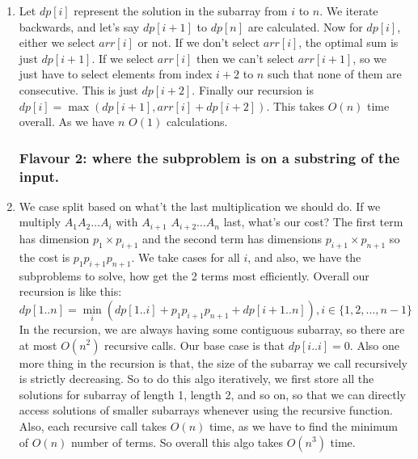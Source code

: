 \documentclass[12pt]{report}
\begin{document}
\begin{enumerate}[label=\textbf{\arabic*.}]
  \item Let $dp[i]$ represent the solution in the subarray from $i$ to $n$. We iterate backwards, and let's say $dp[i+1]$ to $dp[n]$ are calculated. Now for $dp[i]$, either we select $arr[i]$ or not. If we
  don't select $arr[i]$, the optimal sum is just $dp[i+1]$. If we select $arr[i]$ then we can't select $arr[i+1]$, so we just have to select elements from index $i+2$ to $n$ such that none of them are 
  consecutive. This is just $dp[i+2]$. Finally our recursion is $dp[i] = \max(dp[i+1], arr[i] + dp[i+2])$. This takes $O(n)$ time overall. As we have $n$ $O(1)$ calculations.

  \subsubsection*{Flavour 2: where the subproblem is on a substring of the input.}

  \item We case split based on what't the last multiplication we should do. If we multiply $A_1 A_2 \dots A_i$ with $A_{i+1}$ $A_{i+2} \dots A_n$ last, what's our cost? The first term has dimension $p_1 
  \times p_{i+1}$ and the second term has dimensions $p_{i+1} \times p_{n+1}$ so the cost is $p_1 p_{i+1} p_{n+1}$. We take cases for all $i$, and also, we have the subproblems to solve, how get the 2
  terms most efficiently. Overall our recursion is like this:
  \[dp[1 .. n] = \min_i (dp[1 .. i] + p_1 p_{i+1} p_{n+1} + dp[i+1 .. n]), i \in \{1, 2, \dots, n-1\} \]
  In the recursion, we are always having some contiguous subarray, so there are at most $O(n^2)$ recursive calls. Our base case is that $dp[i .. i] = 0$. Also one more thing in the recursion is that, the 
  size of the subarray we call recursively is strictly decreasing. So to do this algo iteratively, we first store all the solutions for subarray of length 1, length 2, and so on, so that we can directly 
  access solutions of smaller subarrays whenever using the recursive function. Also, each recursive call takes $O(n)$ time, as we have to find the minimum of $O(n)$ number of terms.
  So overall this algo takes $O(n^3)$ time.


\end{enumerate}
\end{document}
